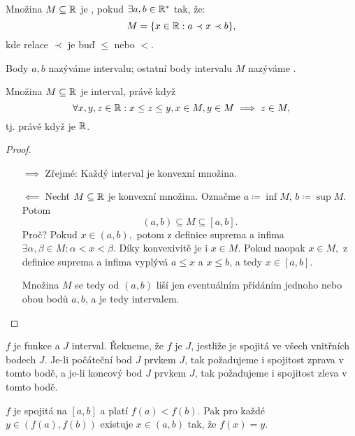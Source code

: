 \begin{definition}
    Množina $M \subseteq \mathbb{R}$ je , pokud 
    $\exists a,b \in \mathbb{R}^*$ tak, že: 
    $$M = \{x \in \mathbb{R}: a \prec x \prec b \},$$ 
    kde relace $\prec$ je buď $\leq$ nebo $<.$

    Body $a,b$ nazýváme  intervalu; ostatní body 
    intervalu $M$ nazýváme .
\end{definition}

\begin{observation}
    \label{obs:intervalconvex}
    Množina $M \subseteq \mathbb{R}$ je interval, právě když
    $$\forall x,y,z\in \mathbb{R}: x\leq z\leq y, x \in M, y\in M \implies z \in M,$$
    tj. právě když je  $\mathbb{R}$.
\end{observation}

\begin{proof}
    \leavevmode
    \begin{itemize}
        \item[$\implies$] Zřejmé: Každý interval je konvexní množina.
        \item[$\impliedby$] Nechť $M \subseteq \mathbb{R}$ je konvexní množina.
            Označme $a \coloneqq \inf M$, $b \coloneqq \sup M.$
            Potom
            $$(a,b) \subseteq M \subseteq [a,b].$$
            Proč? Pokud $x \in (a,b),$ potom z definice suprema a infima
            $\exists \alpha, \beta \in M: \alpha < x < \beta.$ Díky konvexivitě
            je i $x \in M.$ Pokud naopak $x \in M,$ z definice suprema a infima
            vyplývá $a \leq x$ a $x \leq b$, a tedy $x \in [a,b].$

            Množina $M$ se tedy od $(a,b)$ liší jen eventuálním přidáním
            jednoho nebo obou bodů $a,b$, a je tedy intervalem.
    \end{itemize}
\end{proof}

\begin{definition}
    \Necht $f$ je funkce a $J$ interval. Řekneme, že $f$ je 
     $J$, 
    jestliže je spojitá ve všech vnitřních bodech $J$. Je-li počáteční bod $J$
    prvkem $J$, tak požadujeme i spojitost zprava v tomto bodě, a je-li koncový
    bod $J$ prvkem $J$, tak požadujeme i spojitost zleva v tomto bodě.
\end{definition}

\begin{theorem}[Darboux]
    \label{th:darboux}
    \Necht $f$ je spojitá na $[a,b]$ a platí $f(a) < f(b).$ Pak pro každé $y \in 
    (f(a),f(b))$ existuje $x \in (a,b)$ tak, že $f(x) = y.$
\end{theorem}

